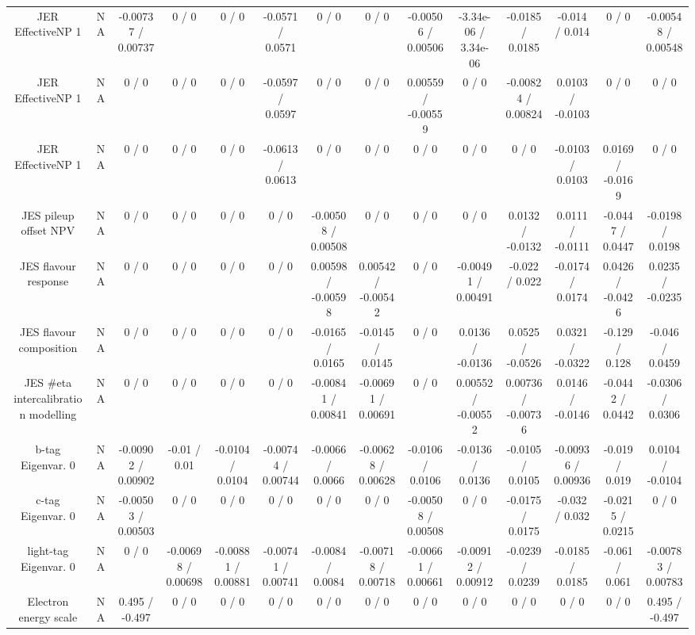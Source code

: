 \documentclass[10pt]{article}
\begin{document}
\begin{table}[htbp]
\begin{center}
\begin{tabular}{|c|c|c|c|c|c|c|c|c|c|c|c|c|c|}
  JER EffectiveNP 1 &    NA    & -0.00737 / 0.00737 & 0 / 0 & 0 / 0 & -0.0571 / 0.0571 & 0 / 0 & 0 / 0 & -0.00506 / 0.00506 & -3.34e-06 / 3.34e-06 & -0.0185 / 0.0185 & -0.014 / 0.014 & 0 / 0 & -0.00548 / 0.00548 \\ 
  JER EffectiveNP 1 &    NA    & 0 / 0 & 0 / 0 & 0 / 0 & -0.0597 / 0.0597 & 0 / 0 & 0 / 0 & 0.00559 / -0.00559 & 0 / 0 & -0.00824 / 0.00824 & 0.0103 / -0.0103 & 0 / 0 & 0 / 0 \\ 
  JER EffectiveNP 1 &    NA    & 0 / 0 & 0 / 0 & 0 / 0 & -0.0613 / 0.0613 & 0 / 0 & 0 / 0 & 0 / 0 & 0 / 0 & 0 / 0 & -0.0103 / 0.0103 & 0.0169 / -0.0169 & 0 / 0 \\ 
  JES pileup offset NPV &    NA    & 0 / 0 & 0 / 0 & 0 / 0 & 0 / 0 & -0.00508 / 0.00508 & 0 / 0 & 0 / 0 & 0 / 0 & 0.0132 / -0.0132 & 0.0111 / -0.0111 & -0.0447 / 0.0447 & -0.0198 / 0.0198 \\ 
  JES flavour response &    NA    & 0 / 0 & 0 / 0 & 0 / 0 & 0 / 0 & 0.00598 / -0.00598 & 0.00542 / -0.00542 & 0 / 0 & -0.00491 / 0.00491 & -0.022 / 0.022 & -0.0174 / 0.0174 & 0.0426 / -0.0426 & 0.0235 / -0.0235 \\ 
  JES flavour composition &    NA    & 0 / 0 & 0 / 0 & 0 / 0 & 0 / 0 & -0.0165 / 0.0165 & -0.0145 / 0.0145 & 0 / 0 & 0.0136 / -0.0136 & 0.0525 / -0.0526 & 0.0321 / -0.0322 & -0.129 / 0.128 & -0.046 / 0.0459 \\ 
  JES #eta intercalibration modelling &    NA    & 0 / 0 & 0 / 0 & 0 / 0 & 0 / 0 & -0.00841 / 0.00841 & -0.00691 / 0.00691 & 0 / 0 & 0.00552 / -0.00552 & 0.00736 / -0.00736 & 0.0146 / -0.0146 & -0.0442 / 0.0442 & -0.0306 / 0.0306 \\ 
  b-tag Eigenvar. 0 &    NA    & -0.00902 / 0.00902 & -0.01 / 0.01 & -0.0104 / 0.0104 & -0.00744 / 0.00744 & -0.0066 / 0.0066 & -0.00628 / 0.00628 & -0.0106 / 0.0106 & -0.0136 / 0.0136 & -0.0105 / 0.0105 & -0.00936 / 0.00936 & -0.019 / 0.019 & 0.0104 / -0.0104 \\ 
  c-tag Eigenvar. 0 &    NA    & -0.00503 / 0.00503 & 0 / 0 & 0 / 0 & 0 / 0 & 0 / 0 & 0 / 0 & -0.00508 / 0.00508 & 0 / 0 & -0.0175 / 0.0175 & -0.032 / 0.032 & -0.0215 / 0.0215 & 0 / 0 \\ 
  light-tag Eigenvar. 0 &    NA    & 0 / 0 & -0.00698 / 0.00698 & -0.00881 / 0.00881 & -0.00741 / 0.00741 & -0.0084 / 0.0084 & -0.00718 / 0.00718 & -0.00661 / 0.00661 & -0.00912 / 0.00912 & -0.0239 / 0.0239 & -0.0185 / 0.0185 & -0.061 / 0.061 & -0.00783 / 0.00783 \\ 
  Electron energy scale &    NA    & 0.495 / -0.497 & 0 / 0 & 0 / 0 & 0 / 0 & 0 / 0 & 0 / 0 & 0 / 0 & 0 / 0 & 0 / 0 & 0 / 0 & 0 / 0 & 0.495 / -0.497 \\ 

\end{tabular}
\end{center}
\end{table}
\end{document}
